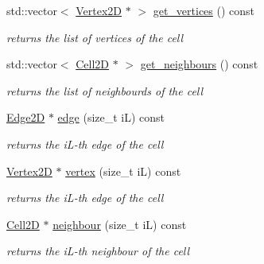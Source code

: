 \begin{DoxyCompactItemize}
\mbox{\label{classHCore2D_1_1Cell2D_a46e1952724941adf122e1df9d6aa3a7e}} 
std\+::vector$<$ \hyperlink{classHCore2D_1_1Vertex2D}{Vertex2D} $\ast$ $>$ \hyperlink{classHCore2D_1_1Cell2D_a46e1952724941adf122e1df9d6aa3a7e}{get\+\_\+vertices} () const
\begin{DoxyCompactList}\small\item\em returns the list of vertices of the cell \end{DoxyCompactList}\item 
\mbox{\label{classHCore2D_1_1Cell2D_aaa5f80dbb7933225228e1a17779b787d}} 
std\+::vector$<$ \hyperlink{classHCore2D_1_1Cell2D}{Cell2D} $\ast$ $>$ \hyperlink{classHCore2D_1_1Cell2D_aaa5f80dbb7933225228e1a17779b787d}{get\+\_\+neighbours} () const
\begin{DoxyCompactList}\small\item\em returns the list of neighbourds of the cell \end{DoxyCompactList}\item 
\mbox{\label{classHCore2D_1_1Cell2D_aa271edfcb512217dc90761f948acabc9}} 
\hyperlink{classHCore2D_1_1Edge2D}{Edge2D} $\ast$ \hyperlink{classHCore2D_1_1Cell2D_aa271edfcb512217dc90761f948acabc9}{edge} (size\+\_\+t iL) const
\begin{DoxyCompactList}\small\item\em returns the i\+L-\/th edge of the cell \end{DoxyCompactList}\item 
\mbox{\label{classHCore2D_1_1Cell2D_aa6665fe1d374e0a0256abdf2dbc760e0}} 
\hyperlink{classHCore2D_1_1Vertex2D}{Vertex2D} $\ast$ \hyperlink{classHCore2D_1_1Cell2D_aa6665fe1d374e0a0256abdf2dbc760e0}{vertex} (size\+\_\+t iL) const
\begin{DoxyCompactList}\small\item\em returns the i\+L-\/th edge of the cell \end{DoxyCompactList}\item 
\mbox{\label{classHCore2D_1_1Cell2D_abdd8c805f1e7f9643d8330342830ac7c}} 
\hyperlink{classHCore2D_1_1Cell2D}{Cell2D} $\ast$ \hyperlink{classHCore2D_1_1Cell2D_abdd8c805f1e7f9643d8330342830ac7c}{neighbour} (size\+\_\+t iL) const
\begin{DoxyCompactList}\small\item\em returns the i\+L-\/th neighbour of the cell \end{DoxyCompactList}\item 

\end{DoxyCompactItemize}
